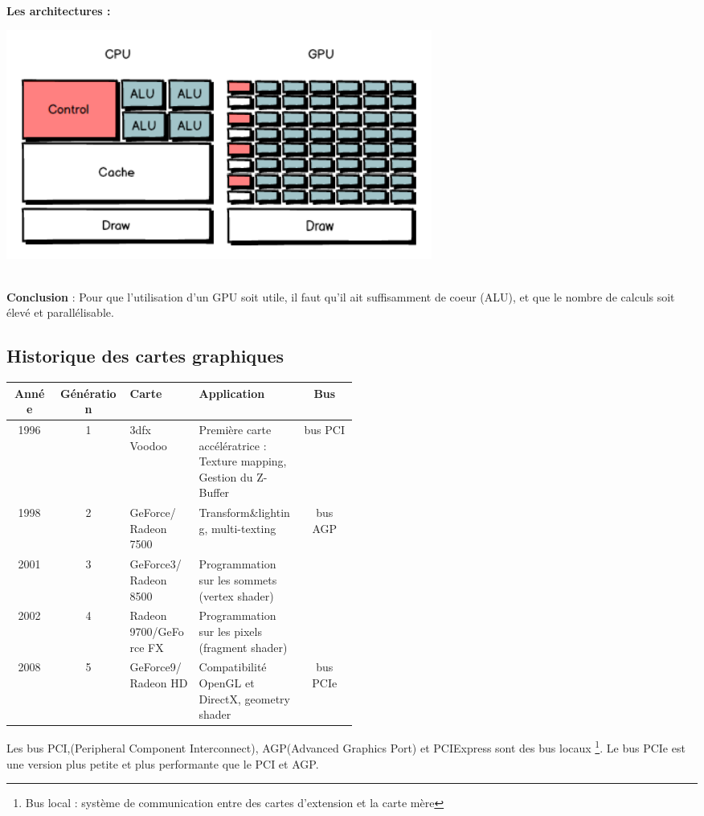 \textbf{\\Les architectures :}
\\
\begin{center}
\includegraphics[width=14cm]{pipeline/images/GPUCPU.png}
\end{center}

\textbf{\\Conclusion} : Pour que l’utilisation d’un GPU soit utile, il faut qu'il ait suffisamment de coeur (ALU), et que le nombre de calculs soit élevé et parallélisable.



\subsection{Historique des cartes graphiques}
\begin{center}
\begin{tabular}{|c|c|m{0.2\linewidth}|m{0.3\linewidth} |c|}
\hline
Année & Génération & Carte & Application & Bus \\
\hline
1996 & 1 & 3dfx Voodoo & Première carte accélératrice : Texture mapping, Gestion du Z-Buffer & bus PCI\\
\hline
1998 & 2 & GeForce/ Radeon 7500 & Transform\&lighting, multi-texting & bus AGP \\
\cline{1-4}
2001 & 3 & GeForce3/ Radeon 8500 & Programmation sur les sommets (vertex shader)	& \\
\cline{1-4}
2002 & 4 & Radeon 9700/GeForce FX & Programmation sur les pixels (fragment shader)	& \\
\hline
2008 & 5 & GeForce9/ Radeon HD & Compatibilité OpenGL et DirectX,  geometry shader & bus PCIe \\
\hline
\end{tabular}
\end{center}

Les bus PCI,(Peripheral Component Interconnect), AGP(Advanced Graphics Port) et PCIExpress sont des bus locaux
\footnote{ Bus local : système de communication entre des cartes d’extension et la carte mère}.
Le bus PCIe est une version plus petite et plus performante que le PCI et AGP.

